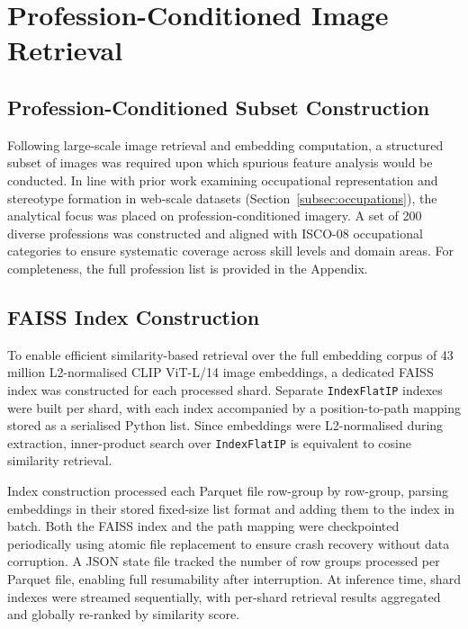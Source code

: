 \graphicspath{{content/chapters/3_methodology/figures/}}


\section{Profession-Conditioned Image Retrieval}

\subsection{Profession-Conditioned Subset Construction}

Following large-scale image retrieval and embedding computation, a structured subset of images was required upon which spurious feature analysis would be conducted. In line with prior work examining occupational representation and stereotype formation in web-scale datasets (Section~\ref{subsec:occupations}), the analytical focus was placed on profession-conditioned imagery. A set of 200 diverse professions was constructed and aligned with ISCO-08 occupational categories to ensure systematic coverage across skill levels and domain areas. For completeness, the full profession list is provided in the Appendix.

\subsection{FAISS Index Construction}

To enable efficient similarity-based retrieval over the full embedding corpus of 43 million L2-normalised CLIP ViT-L/14 image embeddings, a dedicated FAISS index was constructed for each processed shard. Separate \texttt{IndexFlatIP} indexes were built per shard, with each index accompanied by a position-to-path mapping stored as a serialised Python list. Since embeddings were L2-normalised during extraction, inner-product search over \texttt{IndexFlatIP} is equivalent to cosine similarity retrieval.

Index construction processed each Parquet file row-group by row-group, parsing embeddings in their stored fixed-size list format and adding them to the index in batch. Both the FAISS index and the path mapping were checkpointed periodically using atomic file replacement to ensure crash recovery without data corruption. A JSON state file tracked the number of row groups processed per Parquet file, enabling full resumability after interruption. At inference time, shard indexes were streamed sequentially, with per-shard retrieval results aggregated and globally re-ranked by similarity score.


